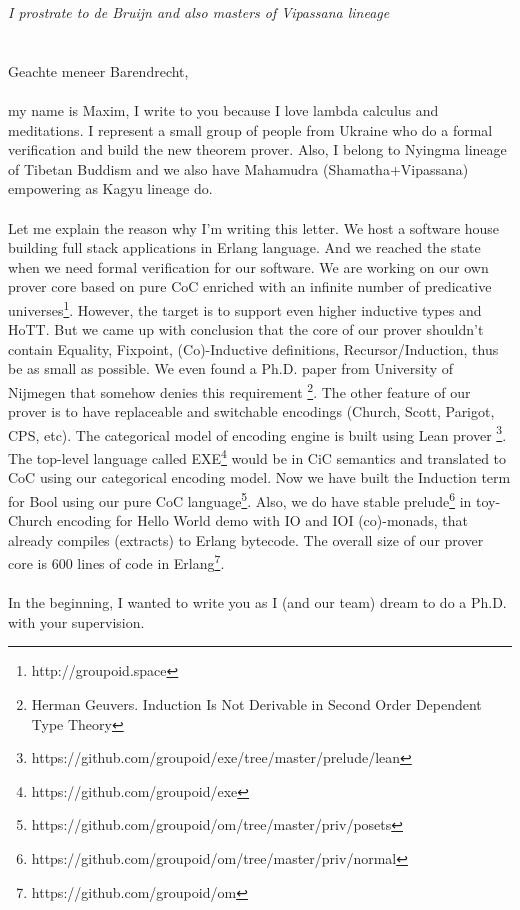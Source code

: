 \documentclass[10pt]{article}
\begin{document}
 {\it \null\hfill\small I prostrate to de Bruijn and also masters of Vipassana lineage}\\
 \\
 \\
Geachte meneer Barendrecht,\\
\\
\indent my name is Maxim, I write to you because I love lambda calculus and meditations.
I represent a small group of people from Ukraine who do a formal verification and build the new theorem prover.
Also, I belong to Nyingma lineage of Tibetan Buddism
and we also have Mahamudra (Shamatha+Vipassana) empowering as Kagyu lineage do.\\
\\
Let me explain the reason why I'm writing this letter.
We host a software house building full stack applications in Erlang language.
And we reached the state when we need formal verification for our software.
We are working on our own prover core based on pure CoC enriched with an infinite number of predicative universes\footnote{http://groupoid.space}.
However, the target is to support even higher inductive types and HoTT.
But we came up with conclusion that the core of our prover shouldn't
contain Equality, Fixpoint, (Co)-Inductive definitions, Recursor/Induction, thus be as small as possible.
We even found a Ph.D. paper from University of Nijmegen that somehow denies this requirement \footnote{Herman Geuvers. Induction Is Not Derivable in Second Order Dependent Type Theory}.
The other feature of our prover is to have replaceable and switchable encodings (Church, Scott, Parigot, CPS, etc).
The categorical model of encoding engine is built using Lean prover \footnote{https://github.com/groupoid/exe/tree/master/prelude/lean}.
The top-level language called EXE\footnote{https://github.com/groupoid/exe} would be in CiC semantics and translated to CoC using our categorical encoding model.
Now we have built the Induction term for Bool using our pure CoC language\footnote{https://github.com/groupoid/om/tree/master/priv/posets}.
Also, we do have stable prelude\footnote{https://github.com/groupoid/om/tree/master/priv/normal} in toy-Church encoding for Hello World demo with IO and IOI (co)-monads,
that already compiles (extracts) to Erlang bytecode.
The overall size of our prover core is 600 lines of code in Erlang\footnote{https://github.com/groupoid/om}.\\
\\
In the beginning, I wanted to write you as I (and our team) dream to do a Ph.D. with your supervision.
\end{document}
